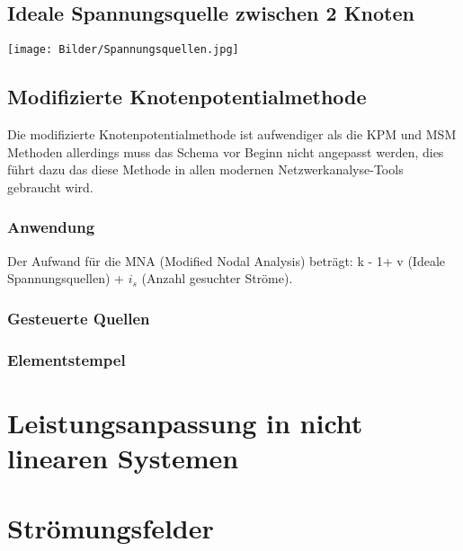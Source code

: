 \documentclass{article}
\begin{document}
    \subsection{Ideale Spannungsquelle zwischen 2 Knoten}
    \begin{center}
        \texttt{[image: Bilder/Spannungsquellen.jpg]}
    \end{center}
    \subsection{Modifizierte Knotenpotentialmethode}
    Die modifizierte Knotenpotentialmethode ist aufwendiger als die KPM und MSM Methoden allerdings muss das Schema vor Beginn nicht angepasst werden, dies führt dazu das diese Methode in allen modernen Netzwerkanalyse-Tools gebraucht wird.
    \subsubsection{Anwendung}
    Der Aufwand für die MNA (Modified Nodal Analysis) beträgt: k - 1+ v (Ideale Spannungsquellen) + $i_s$ (Anzahl gesuchter Ströme). \\
    
    \subsubsection{Gesteuerte Quellen}
    \subsubsection{Elementstempel}
    \newpage
    \section{Leistungsanpassung in nicht linearen Systemen}
    \section{Strömungsfelder}
\end{document}
